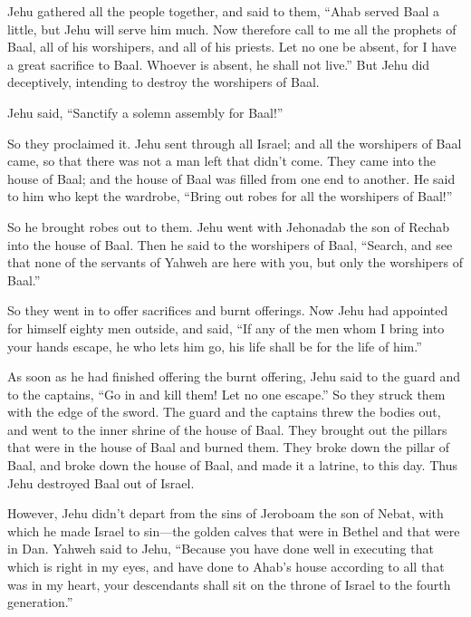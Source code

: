  Jehu gathered all the people together, and said to them,
``Ahab served Baal a little, but Jehu will serve him much.
 Now therefore call to me all the prophets of Baal, all
of his worshipers, and all of his priests. Let no one be absent, for I
have a great sacrifice to Baal. Whoever is absent, he shall not live.''
But Jehu did deceptively, intending to destroy the worshipers of Baal.

 Jehu said, ``Sanctify a solemn assembly for Baal!''

So they proclaimed it.  Jehu sent through all Israel; and
all the worshipers of Baal came, so that there was not a man left that
didn't come. They came into the house of Baal; and the house of Baal was
filled from one end to another.  He said to him who kept
the wardrobe, ``Bring out robes for all the worshipers of Baal!''

So he brought robes out to them.  Jehu went with
Jehonadab the son of Rechab into the house of Baal. Then he said to the
worshipers of Baal, ``Search, and see that none of the servants of
Yahweh are here with you, but only the worshipers of Baal.''

 So they went in to offer sacrifices and burnt offerings.
Now Jehu had appointed for himself eighty men outside, and said, ``If
any of the men whom I bring into your hands escape, he who lets him go,
his life shall be for the life of him.''

 As soon as he had finished offering the burnt offering,
Jehu said to the guard and to the captains, ``Go in and kill them! Let
no one escape.'' So they struck them with the edge of the sword. The
guard and the captains threw the bodies out, and went to the inner
shrine of the house of Baal.  They brought out the
pillars that were in the house of Baal and burned them. 
They broke down the pillar of Baal, and broke down the house of Baal,
and made it a latrine, to this day.  Thus Jehu destroyed
Baal out of Israel.

 However, Jehu didn't depart from the sins of Jeroboam
the son of Nebat, with which he made Israel to sin---the golden calves
that were in Bethel and that were in Dan.  Yahweh said to
Jehu, ``Because you have done well in executing that which is right in
my eyes, and have done to Ahab's house according to all that was in my
heart, your descendants shall sit on the throne of Israel to the fourth
generation.''

